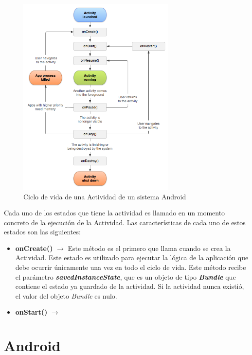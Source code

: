\begin{figure}[h]
\caption{Ciclo de vida de una Actividad de un sistema Android}
\centering
\includegraphics[width=0.7\textwidth]{./Imagenes/Bitmap/Ciclo_de_vida_Android}
\end{figure}

Cada uno de los estados que tiene la actividad es llamado en un momento concreto de la ejecuci\'on de la Actividad. Las caracter\'isticas de cada uno de estos estados son las siguientes:

\begin {itemize}
\item \textbf{onCreate()} $\rightarrow$ Este m\'etodo es el primero que llama cuando se crea la Actividad. Este estado es utilizado para ejecutar la l\'ogica de la aplicaci\'on que debe ocurrir \'unicamente una vez en todo el ciclo de vida. Este m\'etodo recibe el par\'ametro \textit{\textbf{savedInstanceState}}, que es un objeto de tipo \textbf{\textit{Bundle}} que contiene el estado ya guardado de la actividad. Si la actividad nunca existi\'o, el valor del objeto \textit{Bundle} es nulo.
\item \textbf{onStart()} $\rightarrow$ 
\end {itemize}

\section{Android}

